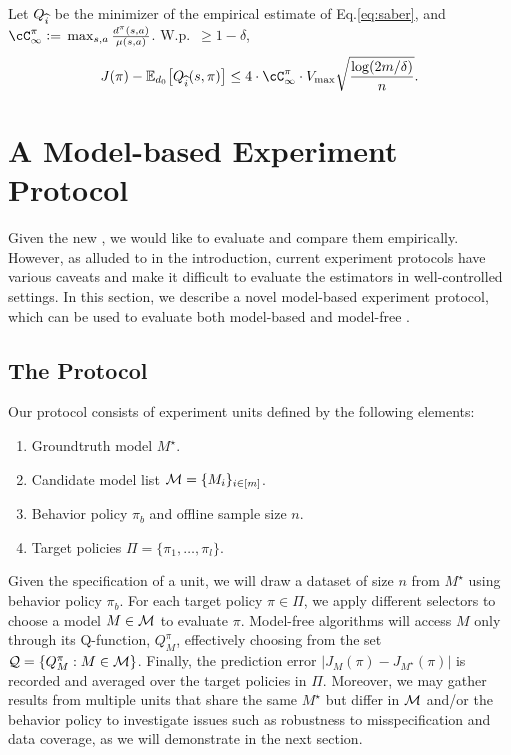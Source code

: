 \begin{theorem}\label{thm:signed}
%
%
%
%
%
Let $Q_{\widehat{i}}$ be the minimizer of the empirical estimate of Eq.\eqref{eq:saber}, and  $\Cinf \ldef{} \max_{s,a} \frac{d^\pi(s,a)}{\mu(s,a)}$. 
W.p.~$\ge 1-\delta$, 
\begin{align}
  J(\pi) - \En_{d_{0}}\sbr*{Q_{\ihat}(s,\pi)} 
  \le 4\cdot\Cinf\cdot\Vmax\sqrt{\frac{\log\rbr*{2m / \delta}}{n}}.
\end{align}
%
\end{theorem}

%

\section{A Model-based Experiment Protocol}

Given the new \sels, we would like to evaluate and compare them empirically. However, as alluded to in the introduction, current experiment protocols have various caveats and make it difficult to evaluate the estimators in well-controlled settings. 
In this section, we describe a novel model-based experiment protocol, which can be used to evaluate both model-based and model-free \sels.  

\subsection{The Protocol} %
Our protocol consists of experiment units defined by the following elements: \vspace{-.6em}
\begin{enumerate}[itemsep=.1pt]
\item Groundtruth model $M^\star$.
\item Candidate model list $\mathcal{M}  = \{M_i\}_{i\in[m]}$.  
\item Behavior policy $\pi_b$ and offline sample size $n$.
\item Target policies $\Pi = \{\pi_1, \ldots, \pi_l\}$.
\end{enumerate} \vspace*{-.6em}
Given the specification of a unit, we will draw a dataset of size $n$ from $M^\star$ using behavior policy $\pi_b$. For each target policy $\pi \in \Pi$, we apply different selectors to choose a model $M\in \mathcal{M}$ to evaluate $\pi$. %
Model-free algorithms will access $M$ only through its Q-function, $Q_M^\pi$, effectively choosing from the set $\mathcal{Q}=\{Q_M^\pi: M\in\mathcal{M}\}$. Finally, the  prediction error $|J_M(\pi) - J_{M^\star}(\pi)|$ is recorded and averaged over the target policies in $\Pi$. 
%
Moreover, we may gather results from multiple units that share the same $M^\star$ but differ in $\mathcal{M}$ and/or the behavior policy to investigate issues such as robustness to misspecification and data coverage, as we will demonstrate in the next section. 

